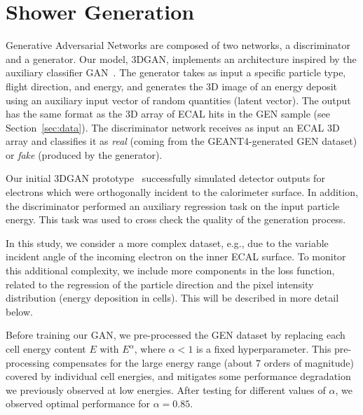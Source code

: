 \chapter{Shower Generation}\label{sec:GAN}

Generative Adversarial Networks are composed of two networks, a discriminator and a generator. Our model, 3DGAN, implements an architecture inspired by the auxiliary classifier GAN~\cite{acgan}. The generator takes as input a specific particle type, flight direction, and energy, and generates the 3D image of an energy deposit using an auxiliary input vector of random quantities (latent vector). 
The output has the same format as the 3D array of ECAL hits in the GEN sample (see Section~\ref{sec:data}). The discriminator network receives as input an ECAL 3D array and classifies it as {\it real} (coming from the GEANT4-generated GEN dataset) or {\it fake} (produced by the generator).

 Our initial 3DGAN prototype~\cite{NIPS} successfully simulated detector outputs for electrons which were orthogonally incident to the calorimeter surface. In addition, the discriminator performed an auxiliary regression task on the input particle energy. This task was used to cross check the quality of the generation process. 
 
 In this study, we consider a more complex dataset, e.g., due to the variable incident angle of the incoming electron on the inner ECAL surface. To monitor this additional complexity, we include more components in the loss function, related to the regression of the particle direction and the pixel intensity distribution (energy deposition in cells). This will be described in more detail below.

Before training our GAN, we pre-processed the GEN dataset by replacing each cell energy content $E$ with $E^\alpha$, where $\alpha<1$ is a fixed hyperparameter. This pre-processing compensates for the large energy range (about 7 orders of magnitude) covered by individual cell energies, and mitigates some performance degradation we previously observed at low energies. After testing for different values of $\alpha$, we observed optimal performance for $\alpha=0.85$.

